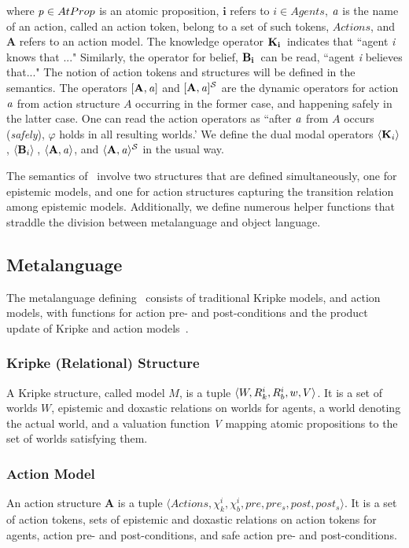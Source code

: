 where $\mathit{p} \in AtProp$ is an atomic proposition, $\mathbf{i}$ refers to $i \in Agents$, $\mathbf{\mathit{a}}$ is the name of an action, called an action token, belong to a set of such tokens, $Actions$, and $\mathbf{A}$ refers to an action model. The knowledge operator $\mathbf{K}_{\mathbf{i}}\,$ indicates that ``agent \emph{i} knows that ..." Similarly, the operator for belief, $\mathbf{B}_{\mathbf{i}}\,$ can be read, ``agent \emph{i} believes that..." The notion of action tokens and structures will be defined in the semantics. The operators $\mathbf{[A,\mathit{a}]}$ and $\mathbf{[A,\mathit{a}]^\mathcal{S}}$ are the dynamic operators for action $\mathit{a}$ from action structure $A$ occurring in the former case, and happening safely in the latter case. One can read the action operators as ``after $\mathit{a}$ from $A$ occurs (\emph{safely}), $\varphi$ holds in all resulting worlds.' We define the dual modal operators $\langle \mathbf{K}_{i} \rangle\,$, $\langle \mathbf{B}_{i} \rangle\,$, $\mathbf{\langle A,\mathit{a}\rangle}$, and $\mathbf{\langle A,\mathit{a}\rangle^\mathcal{S}}$ in the usual way. 

The semantics of \DASL\ involve two structures that are defined simultaneously, one for epistemic models, and one for action structures capturing the transition relation among epistemic models. Additionally, we define numerous helper functions that straddle the division between metalanguage and object language. 

\subsection{Metalanguage}

The metalanguage defining \DASL\ consists of traditional Kripke models, and action models, with functions for action pre- and post-conditions and the product update of Kripke and action models~\cite{DEL}.

\subsubsection{Kripke (Relational) Structure}%
A Kripke structure, called model $M$, is a tuple $\langle W, R_{k}^i, R_{b}^i, w, V \rangle$. It is a set of worlds $W$, epistemic and doxastic relations on worlds for agents, a world denoting the actual world, and a valuation function \emph{V} mapping atomic propositions to the set of worlds satisfying them.

\subsubsection{Action Model}
An action structure $\mathbf{A}$ is a tuple $\langle Actions,\chi_{k}^i, \chi_{b}^i, pre, pre_s, post, post_s \rangle$. It is a set of action tokens, sets of epistemic and doxastic relations on action tokens for agents, action pre- and post-conditions, and safe action pre- and post-conditions. 

